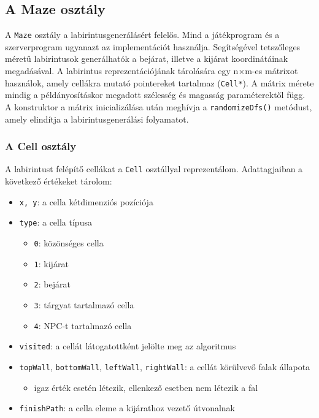 \subsection{A Maze osztály}

A \verb|Maze| osztály a labirintusgenerálásért felelős. Mind a játékprogram és a szerverprogram ugyanazt az implementációt használja. Segítségével tetszőleges méretű labirintusok generálhatók a bejárat, illetve a kijárat koordinátáinak megadásával. A labirintus reprezentációjának tárolására egy n$\times$m-es mátrixot használok, amely cellákra mutató pointereket tartalmaz (\verb|Cell*|). A mátrix mérete mindig a példányosításkor megadott szélesség és magasság paraméterektől függ. A konstruktor a mátrix inicializálása után meghívja a \verb|randomizeDfs()| metódust, amely elindítja a labirintusgenerálási folyamatot.

\subsubsection{A Cell osztály}

A labirintust felépítő cellákat a \verb|Cell| osztállyal reprezentálom. Adattagjaiban a következő értékeket tárolom:

\begin{itemize}
	\item \verb|x, y|: a cella kétdimenziós pozíciója
	\item \verb|type|: a cella típusa
	\begin{itemize}
		\item \verb|0|: közönséges cella
		\item \verb|1|: kijárat
		\item \verb|2|: bejárat
		\item \verb|3|: tárgyat tartalmazó cella
		\item \verb|4|: NPC-t tartalmazó cella
	\end{itemize}
	\item \verb|visited|: a cellát látogatottként jelölte meg az algoritmus
	\item \verb|topWall|, \verb|bottomWall|, \verb|leftWall|, \verb|rightWall|: a cellát körülvevő falak állapota
	\begin{itemize}
		\item igaz érték esetén létezik, ellenkező esetben nem létezik a fal
	\end{itemize}
	\item \verb|finishPath|: a cella eleme a kijárathoz vezető útvonalnak
\end{itemize}


